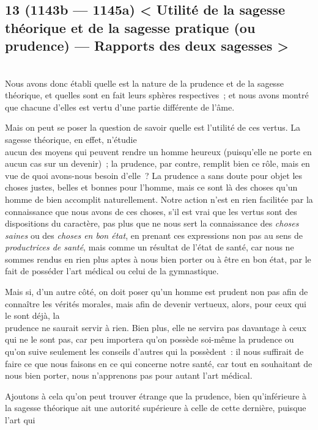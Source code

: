 \documentclass[french,twoside]{book} %
\begin{document}
\subsection[{13 (1143b — 1145a) < Utilité de la sagesse théorique et de la sagesse pratique (ou prudence) — Rapports des deux sagesses >}]{13 (1143b — 1145a) < Utilité de la sagesse théorique et de la sagesse pratique (ou prudence) — Rapports des deux sagesses >}
\noindent \\
Nous avons donc établi quelle est la nature de la prudence et de la sagesse théorique, et quelles sont en fait leurs sphères respectives ; et nous avons montré que chacune d’elles est vertu d’une partie différente de l’âme.\par
Mais on peut se poser la question de savoir quelle est l’utilité de ces vertus. La sagesse théorique, en effet, n’étudie \\
aucun des moyens qui peuvent rendre un homme heureux (puisqu’elle ne porte en aucun cas sur un devenir) ; la prudence, par contre, remplit bien ce rôle, mais en vue de quoi avons-nous besoin d’elle ? La prudence a sans doute pour objet les choses justes, belles et bonnes pour l’homme, mais ce sont là des choses qu’un homme de bien accomplit naturellement. Notre action n’est en rien facilitée par la connaissance que nous avons de ces choses, s’il est vrai que les vertus sont des \\
dispositions du caractère, pas plus que ne nous sert la connaissance des {\itshape choses saines} ou des {\itshape choses en bon état}, en prenant ces expressions non pas au sens de {\itshape productrices de santé}, mais comme un résultat de l’état de santé, car nous ne sommes rendus en rien plus aptes à nous bien porter ou à être en bon état, par le fait de posséder l’art médical ou celui de la gymnastique.\par
Mais si, d’un autre côté, on doit poser qu’un homme est prudent non pas afin de connaître les vérités morales, mais afin de devenir vertueux, alors, pour ceux qui le sont déjà, la \\
prudence ne saurait servir à rien. Bien plus, elle ne servira pas davantage à ceux qui ne le sont pas, car peu importera qu’on possède soi-même la prudence ou qu’on suive seulement les conseils d’autres qui la possèdent : il nous suffirait de faire ce que nous faisons en ce qui concerne notre santé, car tout en souhaitant de nous bien porter, nous n’apprenons pas pour autant l’art médical.\par
Ajoutons à cela qu’on peut trouver étrange que la prudence, bien qu’inférieure à la sagesse théorique ait une autorité supérieure à celle de cette dernière, puisque l’art qui \\
\end{document}
